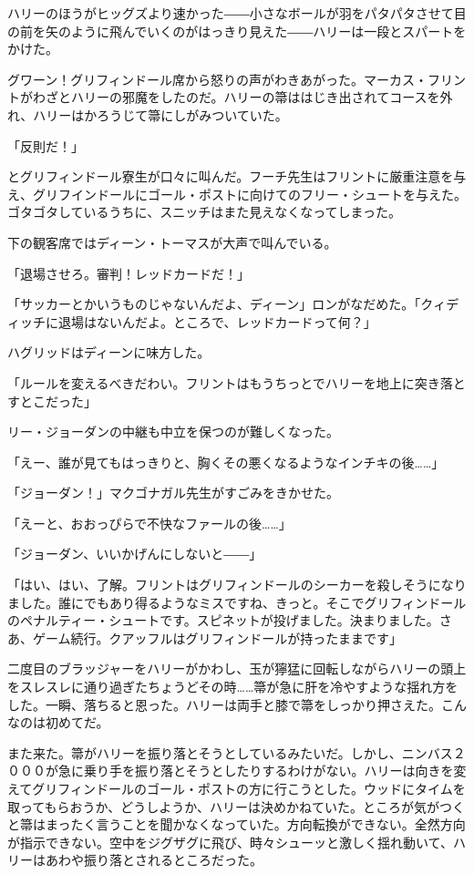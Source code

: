 \documentclass[10pt,a4paper]{article}
\begin{document}
\begin{CJK}{UTF8}{min}
ハリーのほうがヒッグズより速かった――小さなボールが羽をパタパタさせて目の前を矢のように飛んでいくのがはっきり見えた――ハリーは一段とスパートをかけた。

グワーン！グリフィンドール席から怒りの声がわきあがった。マーカス・フリントがわざとハリーの邪魔をしたのだ。ハリーの箒ははじき出されてコースを外れ、ハリーはかろうじて箒にしがみついていた。

「反則だ！」

とグリフィンドール寮生が口々に叫んだ。フーチ先生はフリントに厳重注意を与え、グリフインドールにゴール・ポストに向けてのフリー・シュートを与えた。ゴタゴタしているうちに、スニッチはまた見えなくなってしまった。

下の観客席ではディーン・トーマスが大声で叫んでいる。

「退場させろ。審判！レッドカードだ！」

「サッカーとかいうものじゃないんだよ、ディーン」ロンがなだめた。「クィディッチに退場はないんだよ。ところで、レッドカードって何？」

ハグリッドはディーンに味方した。

「ルールを変えるべきだわい。フリントはもうちっとでハリーを地上に突き落とすとこだった」

リー・ジョーダンの中継も中立を保つのが難しくなった。

「えー、誰が見てもはっきりと、胸くその悪くなるようなインチキの後……」

「ジョーダン！」マクゴナガル先生がすごみをきかせた。

「えーと、おおっぴらで不快なファールの後……」

「ジョーダン、いいかげんにしないと――」

「はい、はい、了解。フリントはグリフィンドールのシーカーを殺しそうになりました。誰にでもあり得るようなミスですね、きっと。そこでグリフィンドールのペナルティー・シュートです。スピネットが投げました。決まりました。さあ、ゲーム続行。クアッフルはグリフィンドールが持ったままです」

二度目のブラッジャーをハリーがかわし、玉が獰猛に回転しながらハリーの頭上をスレスレに通り過ぎたちょうどその時……箒が急に肝を冷やすような揺れ方をした。一瞬、落ちると恩った。ハリーは両手と膝で箒をしっかり押さえた。こんなのは初めてだ。

また来た。箒がハリーを振り落とそうとしているみたいだ。しかし、ニンバス２０００が急に乗り手を振り落とそうとしたりするわけがない。ハリーは向きを変えてグリフィンドールのゴール・ポストの方に行こうとした。ウッドにタイムを取ってもらおうか、どうしようか、ハリーは決めかねていた。ところが気がつくと箒はまったく言うことを聞かなくなっていた。方向転換ができない。全然方向が指示できない。空中をジグザグに飛び、時々シューッと激しく揺れ動いて、ハリーはあわや振り落とされるところだった。


\end{CJK}
\end{document}

